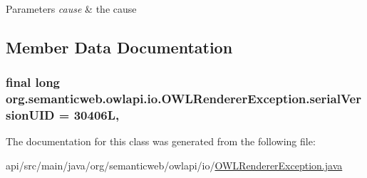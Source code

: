 \begin{DoxyParams}{Parameters}
{\em cause} & the cause \\
\hline
\end{DoxyParams}


\subsection{Member Data Documentation}
\hypertarget{classorg_1_1semanticweb_1_1owlapi_1_1io_1_1_o_w_l_renderer_exception_a4ecee2e84cef35d2a9f77305bd3c9896}{
\subsubsection[{serial\-Version\-U\-I\-D}]{\setlength{\rightskip}{0pt plus 5cm}final long org.\-semanticweb.\-owlapi.\-io.\-O\-W\-L\-Renderer\-Exception.\-serial\-Version\-U\-I\-D = 30406\-L\hspace{0.3cm}{\ttfamily [static]}, {\ttfamily [private]}}}\label{classorg_1_1semanticweb_1_1owlapi_1_1io_1_1_o_w_l_renderer_exception_a4ecee2e84cef35d2a9f77305bd3c9896}


The documentation for this class was generated from the following file\-:\begin{DoxyCompactItemize}
\item 
api/src/main/java/org/semanticweb/owlapi/io/\hyperlink{_o_w_l_renderer_exception_8java}{O\-W\-L\-Renderer\-Exception.\-java}\end{DoxyCompactItemize}
